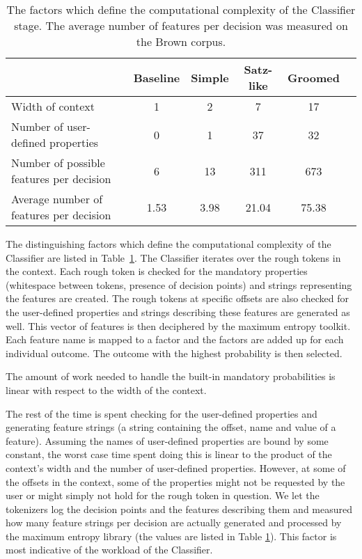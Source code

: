 \begin{table}
  \begin{center}
    \begin{tabular}{ | l | c | c | c | c | c | }
      \hline
      & Baseline & Simple & Satz-like & Groomed \\ \hline
      Width of context & 1 & 2 & 7 & 17 \\ \hline
      Number of user-defined properties & 0 & 1 & 37 & 32 \\ \hline
      Number of possible features per decision & 6 & 13 & 311 & 673 \\ \hline
      Average number of features per decision & 1.53 & 3.98 & 21.04 & 75.38 \\
      \hline
    \end{tabular}
  \end{center}
  \caption[Computational complexity of the Classifier stage]
    {The factors which define the computational complexity of the Classifier
    stage. The average number of features per decision was measured on the
    Brown corpus.}
  \label{tbl:classifier-load-factors}
\end{table}

The distinguishing factors which define the computational complexity of the
Classifier are listed in Table~\ref{tbl:classifier-load-factors}. The
Classifier iterates over the rough tokens in the context. Each rough token is
checked for the mandatory properties (whitespace between tokens, presence of
decision points) and strings representing the features are created. The rough
tokens at specific offsets are also checked for the user-defined properties and
strings describing these features are generated as well. This vector of
features is then deciphered by the maximum entropy toolkit. Each feature name
is mapped to a factor and the factors are added up for each individual outcome.
The outcome with the highest probability is then selected.

The amount of work needed to handle the built-in mandatory probabilities is
linear with respect to the width of the context.

The rest of the time is spent checking for the user-defined properties and
generating feature strings (a string containing the offset, name and value of a
feature). Assuming the names of user-defined properties are bound by some
constant, the worst case time spent doing this is linear to the product of the
context's width and the number of user-defined properties. However, at some of
the offsets in the context, some of the properties might not be requested by
the user or might simply not hold for the rough token in question. We let the
tokenizers log the decision points and the features describing them and
measured how many feature strings per decision are actually generated and
processed by the maximum entropy library (the values are listed in Table
\ref{tbl:classifier-load-factors}). This factor is most indicative of the
workload of the Classifier.

